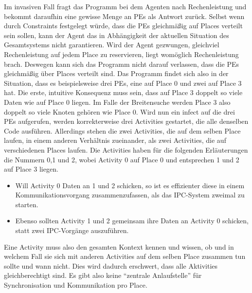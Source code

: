 Im invasiven Fall fragt das Programm bei dem Agenten nach Rechenleistung und bekommt daraufhin eine gewisse Menge an PEs als Antwort zurück. Selbst wenn durch Constraints festgelegt würde, dass die PEs gleichmäßig auf Places verteilt sein sollen, kann der Agent das in Abhängigkeit der aktuellen Situation des Gesamtsystems nicht garantieren. Wird der Agent gezwungen, gleichviel Rechenleistung auf jedem Place zu reservieren, liegt womöglich Rechenleistung brach. Deswegen kann sich das Programm nicht darauf verlassen, dass die PEs gleichmäßig über Places verteilt sind. Das Programm findet sich also in der Situation, dass es beispielsweise drei PEs, eine auf Place 0 und zwei auf Place 3 hat. Die erste, intuitive Konsequenz muss sein, dass auf Place 3 doppelt so viele Daten wie auf Place 0 liegen. Im Falle der Breitensuche werden Place 3 also doppelt so viele Knoten gehören wie Place 0. Wird nun ein infect auf die drei PEs aufgerufen, werden korrekterweise drei Activities gestartet, die alle denselben Code ausführen. Allerdings stehen die zwei Activities, die auf dem selben Place laufen, in einem anderen Verhältnis zueinander, als zwei Activities, die auf verschiedenen Places laufen. Die Activities haben für die folgenden Erläuterungen die Nummern 0,1 und 2, wobei Activity 0 auf Place 0 und entsprechen 1 und 2 auf Place 3 liegen.

\begin{itemize}
	\item Will Activity 0 Daten an 1 und 2 schicken, so ist es effizienter diese in einem Kommunikationsvorgang zusammenzufassen, als das IPC-System zweimal zu starten.
	\item Ebenso sollten Activity 1 und 2 gemeinsam ihre Daten an Activity 0 schicken, statt zwei IPC-Vorgänge auszuführen.
\end{itemize}
Eine Activity muss also den gesamten Kontext kennen und wissen, ob und in welchem Fall sie sich mit anderen Activities auf dem selben Place zusammen tun sollte und wann nicht. Dies wird dadurch erschwert, dass alle Aktivities gleichberechtigt sind. Es gibt also keine \enquote{zentrale Anlaufstelle} für Synchronisation und Kommunikation pro Place.

